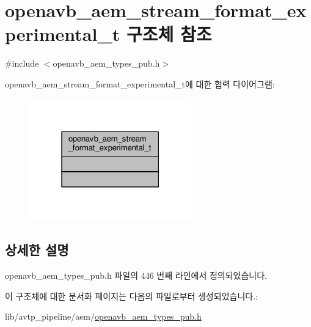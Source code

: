\hypertarget{structopenavb__aem__stream__format__experimental__t}{}\section{openavb\+\_\+aem\+\_\+stream\+\_\+format\+\_\+experimental\+\_\+t 구조체 참조}
\label{structopenavb__aem__stream__format__experimental__t}


{\ttfamily \#include $<$openavb\+\_\+aem\+\_\+types\+\_\+pub.\+h$>$}



openavb\+\_\+aem\+\_\+stream\+\_\+format\+\_\+experimental\+\_\+t에 대한 협력 다이어그램\+:
\nopagebreak
\begin{figure}[H]
\begin{center}
\leavevmode
\includegraphics[width=199pt]{structopenavb__aem__stream__format__experimental__t__coll__graph}
\end{center}
\end{figure}


\subsection{상세한 설명}


openavb\+\_\+aem\+\_\+types\+\_\+pub.\+h 파일의 446 번째 라인에서 정의되었습니다.



이 구조체에 대한 문서화 페이지는 다음의 파일로부터 생성되었습니다.\+:\begin{DoxyCompactItemize}
\item 
lib/avtp\+\_\+pipeline/aem/\hyperlink{openavb__aem__types__pub_8h}{openavb\+\_\+aem\+\_\+types\+\_\+pub.\+h}\end{DoxyCompactItemize}
